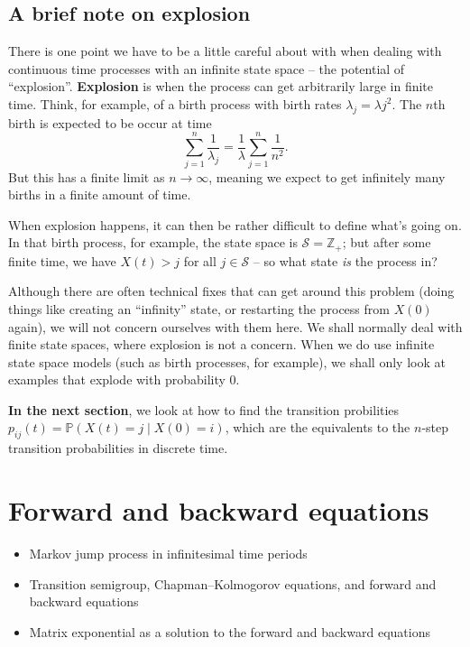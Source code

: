 \documentclass[
  a4paper,
]{article}
\providecommand{\tightlist}{%
  \setlength{\itemsep}{0pt}\setlength{\parskip}{0pt}}
\theoremstyle{definition}
\theoremstyle{definition}
\theoremstyle{definition}
\theoremstyle{remark}
\begin{document}
\hypertarget{a-brief-note-on-explosion}{%
\subsection{A brief note on explosion}\label{a-brief-note-on-explosion}}

There is one point we have to be a little careful about with when dealing with continuous time processes with an infinite state space -- the potential of ``explosion''. \textbf{Explosion} is when the process can get arbitrarily large in finite time. Think, for example, of a birth process with birth rates \(\lambda_j = \lambda j^2\). The \(n\)th birth is expected to be occur at time
\[ \sum_{j=1}^n \frac{1}{\lambda_j} = \frac{1}{\lambda} \sum_{j=1}^n \frac{1}{n^2} . \]
But this has a finite limit as \(n \to \infty\), meaning we expect to get infinitely many births in a finite amount of time.

When explosion happens, it can then be rather difficult to define what's going on. In that birth process, for example, the state space is \(\mathcal S = \mathbb Z_+\); but after some finite time, we have \(X(t) > j\) for all \(j \in \mathcal S\) -- so what state \emph{is} the process in?

Although there are often technical fixes that can get around this problem (doing things like creating an ``infinity'' state, or restarting the process from \(X(0)\) again), we will not concern ourselves with them here. We shall normally deal with finite state spaces, where explosion is not a concern. When we do use infinite state space models (such as birth processes, for example), we shall only look at examples that explode with probability 0.

\textbf{In the next section}, we look at how to find the transition probilities \(p_{ij}(t) = \mathbb P(X(t) = j \mid X(0) = i)\), which are the equivalents to the \(n\)-step transition probabilities in discrete time.

\hypertarget{S18-forward-backward}{%
\section{Forward and backward equations}\label{S18-forward-backward}}

\begin{itemize}
\tightlist
\item
  Markov jump process in infinitesimal time periods
\item
  Transition semigroup, Chapman--Kolmogorov equations, and forward and backward equations
\item
  Matrix exponential as a solution to the forward and backward equations
\end{itemize}
\end{document}
